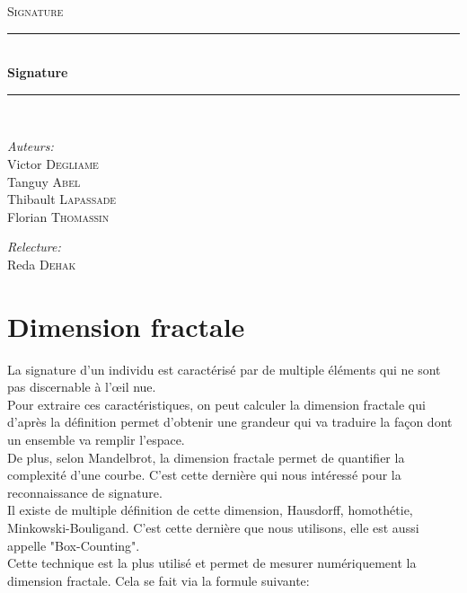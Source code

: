 \documentclass[pdftex,12pt,a4paper]{report}
\newcommand{\HRule}{\rule{\linewidth}{0.5mm}}
\begin{document}
\begin{titlepage}
\begin{center}
\textsc{\LARGE Signature}\\[1.5cm]

\HRule \\[0.4cm]
{\huge \bfseries Signature}\\[0.4cm]
\HRule \\[1.5cm]
\end{center}

\begin{minipage}{0.4\textwidth}
	\begin{flushleft} \large
		\emph{Auteurs:}\\
			Victor \textsc{Degliame} \\
			Tanguy \textsc{Abel} \\
			Thibault \textsc{Lapassade} \\
			Florian \textsc{Thomassin} \\
	\end{flushleft}
\end{minipage}
\begin{minipage}{0.4\textwidth}
	\begin{flushright} \large
		\emph{Relecture:} \\
              Reda \textsc{Dehak}
	\end{flushright}
\end{minipage}
\end{titlepage}

\tableofcontents

\newpage

\chapter{Dimension fractale}
La signature d'un individu est caractérisé par de multiple éléments qui ne sont pas discernable à l'œil nue.\\

Pour extraire ces caractéristiques, on peut calculer la dimension fractale qui d'après la définition permet d'obtenir une grandeur qui va traduire la façon dont un ensemble va remplir l'espace.\\

De plus, selon Mandelbrot, la dimension fractale permet de quantifier la complexité d'une courbe. C'est cette dernière qui nous intéressé pour la reconnaissance de signature.\\

Il existe de multiple définition de cette dimension, Hausdorff, homothétie, Minkowski-Bouligand. C'est cette dernière que nous utilisons, elle est aussi appelle "Box-Counting".\\

Cette technique est la plus utilisé et permet de mesurer numériquement la dimension fractale. Cela se fait via la formule suivante:

\vspace{0.3cm}
\begin{center}
\end{center}
\end{document}
